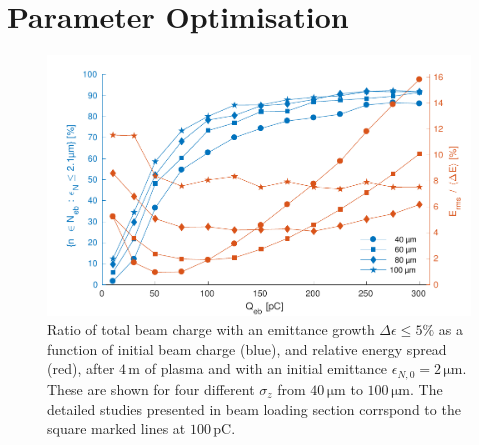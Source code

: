 \documentclass[aps,prstab,reprint,amsmath,amssymb,groupedaddress]{revtex4-1}
\newcommand{\unit}[1]{\,\mathrm{#1}}
\begin{document}
\section[\label{S:PO}]{Parameter Optimisation}

\begin{figure}[hbt]
    \includegraphics[width=\linewidth,trim={2mm 0mm 2mm 0mm},clip]{figures/beamQuality}
    \caption{\label{Fig:BeamQ} Ratio of total beam charge with an emittance growth $\Delta\epsilon \leq 5\%$ as a
        function of initial beam charge (blue), and relative energy spread (red), after $4\unit{m}$ of plasma and with
        an initial emittance $\epsilon_{N,0}=2\unit{\mu m}$. These are shown for four different $\sigma_{z}$ from
        $40\unit{\mu m}$ to $100\unit{\mu m}$. The detailed studies presented in beam loading section corrspond to the
        square marked lines at $100\unit{pC}$.}
\end{figure}
\end{document}
